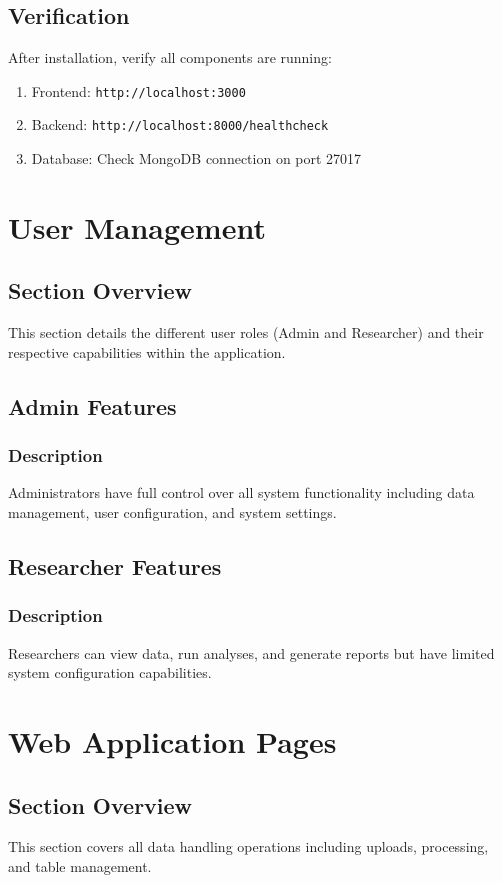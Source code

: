 \documentclass[12pt]{article}
\begin{document}
\subsection{Verification}
After installation, verify all components are running:
\begin{enumerate}
    \item Frontend: \texttt{http://localhost:3000}
    \item Backend: \texttt{http://localhost:8000/healthcheck}
    \item Database: Check MongoDB connection on port 27017
\end{enumerate}

\section{User Management}
\subsection*{Section Overview}
This section details the different user roles (Admin and Researcher) and their
respective capabilities within the application.

\subsection{Admin Features}
\subsubsection*{Description}
Administrators have full control over all system functionality including data
management, user configuration, and system settings.


\subsection{Researcher Features}
\subsubsection*{Description}
Researchers can view data, run analyses, and generate reports but have limited
system configuration capabilities.

\section{Web Application Pages}
\subsection*{Section Overview}
This section covers all data handling operations including uploads, processing,
and table management.
\end{document}

